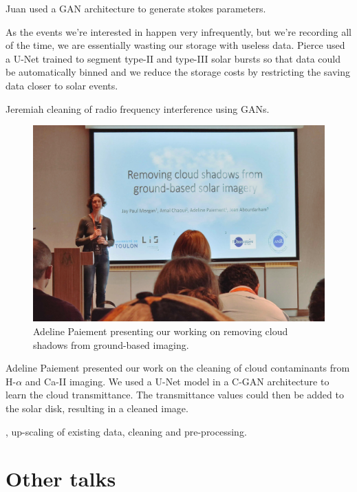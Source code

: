 \documentclass[11pt]{article}
\begin{document}
Juan used a GAN architecture to generate stokes parameters.

As the events we're interested in happen very infrequently, but we're
recording all of the time, we are essentially wasting our storage with
useless data. Pierce used a U-Net trained to segment type-II and
type-III solar bursts so that data could be automatically binned and
we reduce the storage costs by restricting the saving data closer to
solar events.

Jeremiah cleaning of radio frequency interference using GANs.

\begin{figure}[htbp]
\centering
\includegraphics[width=1.0\textwidth]{images/20230420_163823.jpg}
\caption{Adeline Paiement presenting our working on removing cloud shadows from ground-based imaging.}
\end{figure}

Adeline Paiement presented our work on the cleaning of cloud
contaminants from H-\(\alpha\) and Ca-II imaging. We used a U-Net model in
a C-GAN architecture to learn the cloud transmittance. The
transmittance values could then be added to the solar disk, resulting
in a cleaned image.



, up-scaling of existing data, cleaning and
pre-processing.

\section{Other talks}
\label{sec:orgff30e68}
\end{document}
